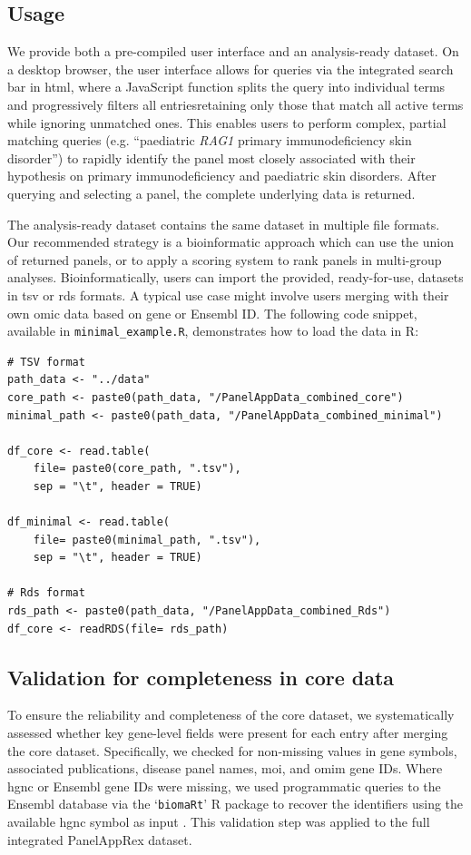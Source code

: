 \subsection{Usage}
\noindent
We provide both a pre-compiled user interface and an analysis-ready dataset.
On a desktop browser, the user interface allows for queries via the integrated search bar in \ac{html}, where a JavaScript function splits the query into individual terms and progressively filters all entries\DIFdelbegin \DIFdel{- }\DIFdelend \DIFaddbegin \DIFadd{, }\DIFaddend retaining only those that match all active terms while ignoring unmatched ones. This enables users to perform complex, partial matching queries (e.g. ``paediatric \textit{RAG1} primary immunodeficiency skin disorder'') to rapidly identify the panel most closely associated with their hypothesis on primary immunodeficiency and paediatric skin disorders.
After querying and selecting a panel, the complete underlying data is returned.

The analysis-ready dataset contains the same dataset in multiple file formats.
Our recommended strategy is a bioinformatic approach which can use the union of returned panels, or to apply a scoring system to rank panels in multi-group analyses.
Bioinformatically, users can import the provided, ready-for-use, datasets in \ac{tsv} or \ac{rds} formats.
A typical use case might involve users merging with their own omic data based on gene or Ensembl ID.
The following code snippet, available in \texttt{minimal\_example.R}, demonstrates how to load the data in R:
\begin{verbatim}
# TSV format
path_data <- "../data"
core_path <- paste0(path_data, "/PanelAppData_combined_core")
minimal_path <- paste0(path_data, "/PanelAppData_combined_minimal")

df_core <- read.table(
    file= paste0(core_path, ".tsv"), 
    sep = "\t", header = TRUE)

df_minimal <- read.table(
    file= paste0(minimal_path, ".tsv"), 
    sep = "\t", header = TRUE)

# Rds format
rds_path <- paste0(path_data, "/PanelAppData_combined_Rds")
df_core <- readRDS(file= rds_path)
\end{verbatim}

\subsection{Validation for completeness in core data}
\noindent
To ensure the reliability and completeness of the core dataset, we systematically assessed whether key gene-level fields were present for each entry after merging the core dataset.
Specifically, we checked for non-missing values in gene symbols, associated publications, disease panel names, \ac{moi}, and \ac{omim} gene IDs. 
Where \ac{hgnc} or Ensembl gene IDs were missing, we used programmatic queries to the Ensembl database via the `\texttt{biomaRt}' R package to recover the identifiers using the available \ac{hgnc} symbol as input \cite{steffen_durinck_biomart}. 
This validation step was applied to the full integrated PanelAppRex dataset.

